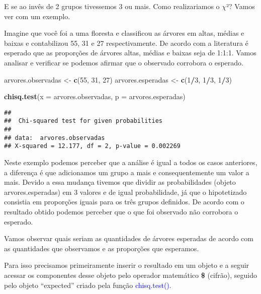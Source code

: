 \documentclass[titlepage, oneside, openany, a4paper]{book}
\newenvironment{Shaded}{\begin{snugshade}}{\end{snugshade}}
\newcommand{\DataTypeTok}[1]{\textcolor[rgb]{0.13,0.29,0.53}{#1}}
\newcommand{\DecValTok}[1]{\textcolor[rgb]{0.00,0.00,0.81}{#1}}
\newcommand{\KeywordTok}[1]{\textcolor[rgb]{0.13,0.29,0.53}{\textbf{#1}}}
\newcommand{\NormalTok}[1]{#1}
\newcommand{\OperatorTok}[1]{\textcolor[rgb]{0.81,0.36,0.00}{\textbf{#1}}}
\newcommand{\StringTok}[1]{\textcolor[rgb]{0.31,0.60,0.02}{#1}}
\begin{document}
E se ao invês de 2 grupos tivessemos 3 ou mais. Como realizariamos o \(\chi\)²? Vamos ver com um exemplo.

Imagine que você foi a uma floresta e classificou as árvores em altas, médias e baixas e contabilizou 55, 31 e 27 respectivamente. De acordo com a literatura é esperado que as proporções de árvores altas, médias e baixas seja de 1:1:1. Vamos analisar e verificar se podemos afirmar que o observado corrobora o esperado.

\begin{Shaded}
\begin{Highlighting}[]
\NormalTok{arvores.observadas <-}\StringTok{ }\KeywordTok{c}\NormalTok{(}\DecValTok{55}\NormalTok{, }\DecValTok{31}\NormalTok{, }\DecValTok{27}\NormalTok{)}
\NormalTok{arvores.esperadas <-}\StringTok{ }\KeywordTok{c}\NormalTok{(}\DecValTok{1}\OperatorTok{/}\DecValTok{3}\NormalTok{, }\DecValTok{1}\OperatorTok{/}\DecValTok{3}\NormalTok{, }\DecValTok{1}\OperatorTok{/}\DecValTok{3}\NormalTok{)}

\KeywordTok{chisq.test}\NormalTok{(}\DataTypeTok{x =}\NormalTok{ arvores.observadas, }\DataTypeTok{p =}\NormalTok{ arvores.esperadas)}
\end{Highlighting}
\end{Shaded}

\begin{verbatim}
## 
##  Chi-squared test for given probabilities
## 
## data:  arvores.observadas
## X-squared = 12.177, df = 2, p-value = 0.002269
\end{verbatim}

Neste exemplo podemos perceber que a análise é igual a todos os casos anteriores, a diferença é que adicionamos um grupo a mais e consequentemente um valor a mais. Devido a essa mudança tivemos que dividir as probabilidades (objeto arvores.esperadas) em 3 valores e de igual probabilidade, já que o hipotetizado consistia em proporções iguais para os três grupos definidos. De acordo com o resultado obtido podemos perceber que o que foi observado não corrobora o esperado.

Vamos observar quais seriam as quantidades de árvores esperadas de acordo com as quantidades que observamos e as proporções que esperamos.

Para isso precisamos primeiramente inserir o resultado em um objeto e a seguir acessar os componentes desse objeto pelo operador matemático \textbf{\$} (cifrão), seguido pelo objeto ``expected'' criado pela função \textcolor{blue}{chisq.test()}.
\end{document}
